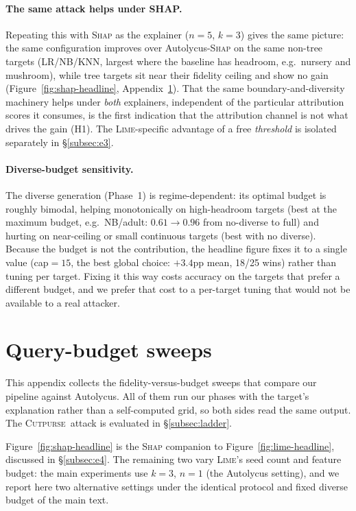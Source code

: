 \documentclass[sigconf,anonymous,review]{acmart}
\newcommand{\sys}{\textsc{Cutpurse}}
\begin{document}
\paragraph{The same attack helps under SHAP.}
Repeating this with \textsc{Shap} as the explainer ($n{=}5$, $k{=}3$) gives the same picture: the
same configuration improves over Autolycus-\textsc{Shap} on the same non-tree targets (LR/NB/KNN,
largest where the baseline has headroom, e.g.\ nursery and mushroom), while tree targets sit near
their fidelity ceiling and show no gain (Figure~\ref{fig:shap-headline}, Appendix~\ref{app:sweeps}).
That the same boundary-and-diversity machinery helps under \emph{both} explainers, independent of the particular attribution scores it consumes, is the first indication that the attribution channel is
not what drives the gain (H1). The \textsc{Lime}-specific advantage of a free \emph{threshold} is
isolated separately in \S\ref{subsec:e3}.

\paragraph{Diverse-budget sensitivity.}
The diverse generation (Phase~1) is regime-dependent: its optimal budget is roughly bimodal,
helping monotonically on high-headroom targets (best at the maximum budget, e.g.\ NB/adult:
$0.61{\to}0.96$ from no-diverse to full) and hurting on near-ceiling or small continuous targets
(best with no diverse). Because the budget is not the contribution, the headline figure fixes it
to a single value (cap${=}15$, the best global choice: $+3.4$pp mean, 18/25 wins) rather than
tuning per target. Fixing it this way costs accuracy on the targets that prefer a different budget,
and we prefer that cost to a per-target tuning that would not be available to a real attacker.

\section{Query-budget sweeps}
\label{app:sweeps}
\label{app:robustness}
This appendix collects the fidelity-versus-budget sweeps that compare our pipeline against Autolycus.
All of them run our phases with the target's explanation rather than a self-computed grid, so both
sides read the same output. The \sys\ attack is evaluated in \S\ref{subsec:ladder}.

Figure~\ref{fig:shap-headline} is the \textsc{Shap} companion to Figure~\ref{fig:lime-headline},
discussed in \S\ref{subsec:e4}. The remaining two vary \textsc{Lime}'s seed count and feature budget:
the main experiments use $k{=}3$, $n{=}1$ (the Autolycus setting), and we report here two alternative
settings under the identical protocol and fixed diverse budget of the main text.
\end{document}
